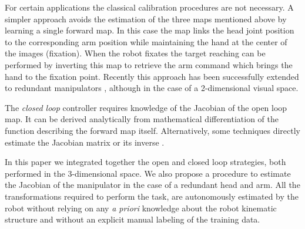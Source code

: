For certain applications the classical calibration procedures are not 
necessary. A simpler approach \cite{blackburn94learning} avoids the estimation 
of the three maps mentioned above by learning a single forward map. 
In this case the map links the head joint position to the corresponding arm 
position while maintaining the hand at the center of the images (fixation). 
When the robot fixates the target reaching can be performed by inverting this 
map to retrieve the arm command which brings the hand to the fixation point. 
Recently this approach has been successfully extended to redundant manipulators
 \cite{lopes06learning}, although in the case of a 2-dimensional visual space.

The {\em closed loop} controller requires knowledge of the Jacobian of the 
open loop map. It can be derived analytically from mathematical 
differentiation of the function describing the forward map itself. 
Alternatively, some techniques directly estimate the Jacobian matrix
\cite{Hosoda94versatile,Mansard06jacobian} or its inverse \cite{Lapreste04efficient}.

In this paper we integrated together the 
open \cite{blackburn94learning,Mansard06jacobian,scaz07fast} and closed 
\cite{Hosoda94versatile,lopes06learning} loop strategies, both performed in 
the 3-dimensional space.
We also propose a procedure to estimate 
the Jacobian of the manipulator in the case of a redundant head and arm. 
All the transformations required to perform the task, are autonomously 
estimated by the robot without relying on any \emph{a priori} knowledge 
about the robot kinematic structure and without an explicit manual labeling 
of the training data.
